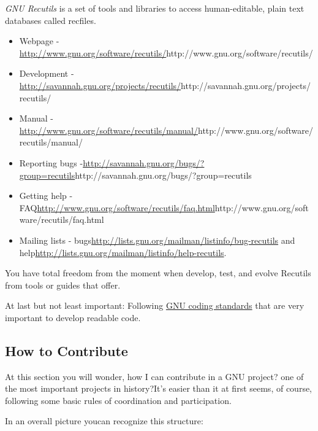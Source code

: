 \textit{GNU Recutils} is a set of tools and libraries to access human-editable, plain text databases called recfiles.

\begin{itemize}
	\item Webpage -\url{http://www.gnu.org/software/recutils/}{http://www.gnu.org/software/recutils/}
	\item Development -\url{http://savannah.gnu.org/projects/recutils/}{http://savannah.gnu.org/projects/recutils/}
	\item Manual -\url{http://www.gnu.org/software/recutils/manual/}{http://www.gnu.org/software/recutils/manual/}
	\item Reporting bugs -\url{http://savannah.gnu.org/bugs/?group=recutils}{http://savannah.gnu.org/bugs/?group=recutils}
	\item Getting help - FAQ\url{http://www.gnu.org/software/recutils/faq.html}{http://www.gnu.org/software/recutils/faq.html}
	\item Mailing lists - bugs\url{http://lists.gnu.org/mailman/listinfo/bug-recutils} and help\url{http://lists.gnu.org/mailman/listinfo/help-recutils}.
\end{itemize}

\par You have total freedom from the moment when develop, test, and evolve Recutils from tools or guides that offer.

\par At last but not least important: Following \href{http://www.gnu.org/prep/standards/}{GNU coding standards} that are very important to develop readable code.

\subsection{How to Contribute}

\par At this section you will wonder, how I can contribute in a GNU project? one of the most important projects in history?It's easier than it at first seems, of course, following some basic rules of coordination and participation.

\par In an overall picture youcan recognize this structure:


